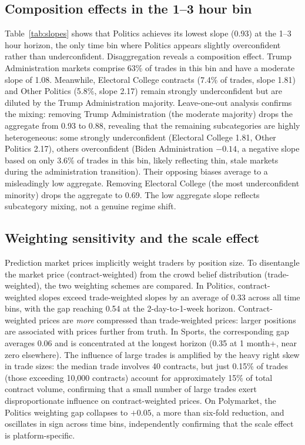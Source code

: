 \documentclass[numsec,webpdf,modern,medium]{oup-authoring-template}
\theoremstyle{thmstyleone}%
\theoremstyle{thmstyletwo}%
\theoremstyle{thmstylethree}%
\begin{document}
\subsection{Composition effects in the 1--3 hour bin}\label{sec:composition}

Table~\ref{tab:slopes} shows that Politics achieves its lowest slope (0.93) at the 1--3 hour horizon, the only time bin where Politics appears slightly overconfident rather than underconfident. Disaggregation reveals a composition effect. Trump Administration markets comprise 63\% of trades in this bin and have a moderate slope of 1.08. Meanwhile, Electoral College contracts (7.4\% of trades, slope 1.81) and Other Politics (5.8\%, slope 2.17) remain strongly underconfident but are diluted by the Trump Administration majority. Leave-one-out analysis confirms the mixing: removing Trump Administration (the moderate majority) drops the aggregate from 0.93 to 0.88, revealing that the remaining subcategories are highly heterogeneous: some strongly underconfident (Electoral College 1.81, Other Politics 2.17), others overconfident (Biden Administration $-0.14$, a negative slope based on only 3.6\% of trades in this bin, likely reflecting thin, stale markets during the administration transition). Their opposing biases average to a misleadingly low aggregate. Removing Electoral College (the most underconfident minority) drops the aggregate to 0.69. The low aggregate slope reflects subcategory mixing, not a genuine regime shift.
\subsection{Weighting sensitivity and the scale effect}\label{sec:weighting}

Prediction market prices implicitly weight traders by position size. To disentangle the market price (contract-weighted) from the crowd belief distribution (trade-weighted), the two weighting schemes are compared. In Politics, contract-weighted slopes exceed trade-weighted slopes by an average of 0.33 across all time bins, with the gap reaching 0.54 at the 2-day-to-1-week horizon. Contract-weighted prices are \emph{more} compressed than trade-weighted prices: larger positions are associated with prices further from truth. In Sports, the corresponding gap averages 0.06 and is concentrated at the longest horizon (0.35 at 1 month+, near zero elsewhere). The influence of large trades is amplified by the heavy right skew in trade sizes: the median trade involves 40 contracts, but just 0.15\% of trades (those exceeding 10,000 contracts) account for approximately 15\% of total contract volume, confirming that a small number of large trades exert disproportionate influence on contract-weighted prices. On Polymarket, the Politics weighting gap collapses to $+0.05$, a more than six-fold reduction, and oscillates in sign across time bins, independently confirming that the scale effect is platform-specific.
\end{document}
